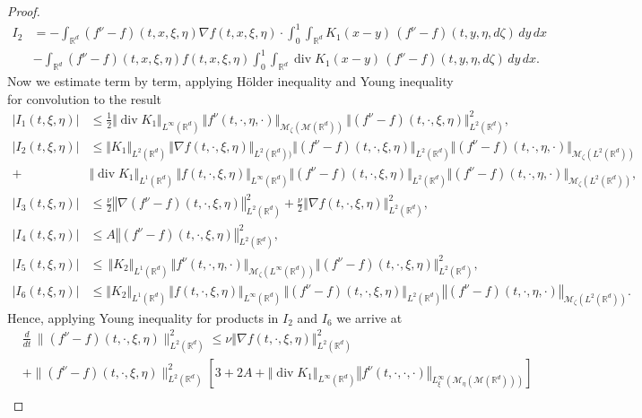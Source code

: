 \documentclass[10pt]{article}
\def\divv{\operatorname {div}}
\newcommand*{\norm}[1]{\left\Vert{#1}\right\Vert}
\newcommand{\R}{\mathbb{R}}
\newcommand{\ird}{\int_{\mathbb{R}^d}}
\begin{document}
\begin{proof}
\begin{align*}
    I_2 &=  -\ird(f^\nu-f)(t,x,\xi,\eta) \nabla f(t,x,\xi,\eta)\cdot \int_0^1\int_{\R^{d}}  K_1(x-y)\, (f^\nu-f)(t,y,\eta, d\zeta) \,dy \,dx \\
    &-\ird(f^\nu-f)(t,x,\xi,\eta) f(t,x,\xi,\eta)\int_0^1\int_{\R^{d}} \divv K_1(x-y)\, (f^\nu-f)(t,y,\eta, d\zeta) \,dy \,dx.
\end{align*}
Now we estimate term by term, applying  H\"older  inequality and Young inequality for convolution to the result
\begin{align*}
\vert I_1(t,\xi,\eta)\vert&\leq \frac{1}{2}\Vert \divv K_1\Vert_{L^\infty(\R^d)}\,\Vert f^\nu(t,\cdot,\eta,\cdot)\Vert_{\mathcal{M}_{\zeta}(\mathcal{M}(\R^d))}\,\Vert  (f^\nu - f)(t,\cdot,\xi,\eta)\Vert_{L^2(\R^d)}^2,\\
\vert I_2(t,\xi,\eta)\vert &\leq  \Vert  K_1\Vert_{L^2(\R^d)}\,\Vert \nabla f(t,\cdot,\xi,\eta)\Vert_{L^2(\R^d))}\Vert (f^\nu-f)(t,\cdot,\xi,\eta)\Vert_{L^2(\R^d)} \Vert (f^\nu-f)(t,\cdot,\eta,\cdot)\Vert_{\mathcal{M}_{\zeta}(L^2(\R^d))}\\ 
+& \Vert  \divv K_1\Vert_{L^1(\R^d)}\,\Vert f(t,\cdot,\xi,\eta)\Vert_{L^{\infty}(\R^d)}\Vert (f^\nu-f)(t,\cdot,\xi,\eta)\Vert_{L^2(\R^d)}\Vert (f^\nu-f)(t,\cdot,\eta,\cdot)\Vert_{\mathcal{M}_{\zeta}(L^2(\R^d))},\\
\vert I_3(t,\xi,\eta)\vert &\leq \frac{\nu}{2}\norm{\nabla(f^\nu - f)(t,\cdot,\xi,\eta)}^2_{L^{2}(\R^d)} + \frac{\nu}{2}\norm{\nabla f(t,\cdot,\xi,\eta)}_{L^{2}(\R^d)}^2,\\
\vert I_4(t,\xi,\eta)\vert &\leq A \norm{(f^\nu - f)(t,\cdot,\xi,\eta)}^2_{L^{2}(\R^d)},\\
\vert I_5(t,\xi,\eta)\vert &\leq \,\Vert  K_2\Vert_{L^1(\R^d)}\,\Vert f^\nu(t,\cdot,\eta,\cdot)\Vert_{\mathcal{M}_{\zeta}(L^{\infty}(\R^d))}\Vert (f^\nu- f)(t,\cdot,\xi,\eta)\Vert_{L^2(\R^d)}^2,\\
\vert I_6(t,\xi,\eta)\vert &\leq \Vert  K_2\Vert_{L^1(\R^d)}\,\Vert f(t,\cdot,\xi,\eta)\Vert_{L^\infty(\R^d)}\,\Vert (f^\nu- f)(t,\cdot,\xi,\eta)\Vert_{L^2(\R^d)}\norm{(f^\nu - f)(t,\cdot,\eta,\cdot)}_{\mathcal{M}_{\zeta}(L^{2}(\R^d))}.
\end{align*}
Hence, applying Young inequality for products in $I_2$ and $I_6$ we arrive at
\begin{align*}
   & \frac{d}{dt} \,\| (f^\nu-f)(t, \cdot, \xi,\eta)\|_{L^2(\R^d)}^2 \leq \nu \norm{\nabla f(t,\cdot,\xi,\eta)}_{L^{2}(\R^d)}^2\\
    & +\| (f^\nu-f)(t, \cdot, \xi,\eta)\|_{L^2(\R^d)}^2 \left[3+2A+\norm{\divv K_1}_{L^{\infty}(\R^d)}\norm{f^\nu(t,\cdot,\cdot,\cdot)}_{L^{\infty}_\xi(\mathcal{M}_{\eta}(\mathcal{M}(\R^d)))}\right] \\

\end{align*}
\end{proof}
\end{document}
